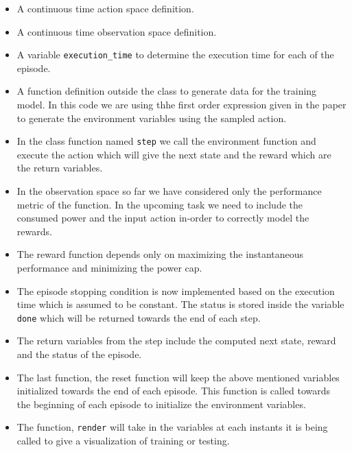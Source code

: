 \documentclass{article}
\begin{document}
\begin{itemize}
    \item A continuous time action space definition.
    \item A continuous time observation space definition.
    \item A variable \texttt{execution\_time} to determine the execution time for each of the episode.
    \item A function definition outside the class to generate data for the training model. In this code we are using thhe first order expression given in the paper \cite{cerf2021sustaining} to generate the environment variables using the sampled action.
    \item In the class function named \texttt{step} we call the environment function and execute the action which will give the next state and the reward which are the return variables.
    \item In the observation space so far we have considered only the performance metric of the function. In the upcoming task we need to include the consumed power and the input action in-order to correctly model the rewards.
    \item The reward function depends only on maximizing the instantaneous performance and minimizing the power cap.
    \item The episode stopping condition is now implemented based on the execution time which is assumed to be constant. The status is stored inside the variable \texttt{done} which will be returned towards the end of each step.
    \item The return variables from the step include the computed next state, reward and the status of the episode.
    \item The last function, the reset function will keep the above mentioned variables initialized towards the end of each episode. This function is called towards the beginning of each episode to initialize the environment variables.
    \item The function, \texttt{render} will take in the variables at each instants it is being called to give a visualization of training or testing.
\end{itemize}
\end{document}
